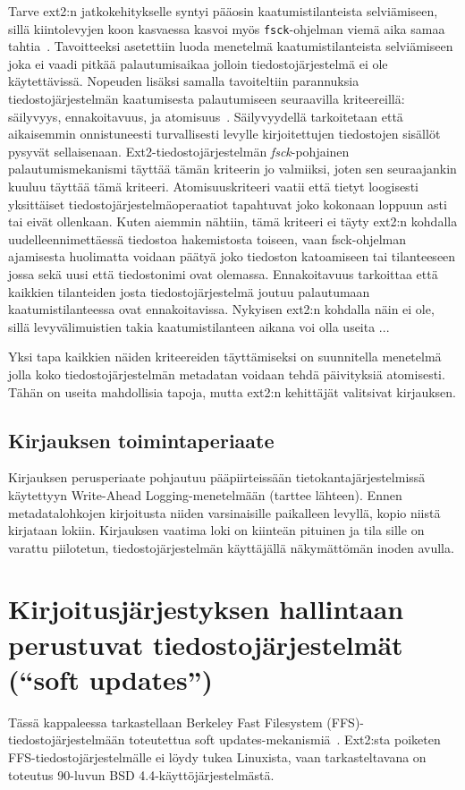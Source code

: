 Tarve ext2:n jatkokehitykselle syntyi pääosin kaatumistilanteista selviämiseen,
sillä kiintolevyjen koon kasvaessa kasvoi myös \texttt{fsck}-ohjelman viemä aika samaa tahtia~\cite{Ext2Journal}.
Tavoitteeksi asetettiin luoda menetelmä kaatumistilanteista selviämiseen joka ei vaadi pitkää palautumisaikaa jolloin tiedostojärjestelmä ei ole käytettävissä.
Nopeuden lisäksi samalla tavoiteltiin parannuksia tiedostojärjestelmän kaatumisesta palautumiseen seuraavilla kriteereillä: säilyvyys, ennakoitavuus, ja atomisuus~\cite{Ext2Journal}.
Säilyvyydellä tarkoitetaan että aikaisemmin onnistuneesti turvallisesti levylle kirjoitettujen tiedostojen sisällöt pysyvät sellaisenaan.
Ext2-tiedostojärjestelmän \emph{fsck}-pohjainen palautumismekanismi täyttää tämän kriteerin jo valmiiksi,
joten sen seuraajankin kuuluu täyttää tämä kriteeri.
Atomisuuskriteeri vaatii että tietyt loogisesti yksittäiset tiedostojärjestelmäoperaatiot tapahtuvat
joko kokonaan loppuun asti tai eivät ollenkaan.
Kuten aiemmin nähtiin, tämä kriteeri ei täyty ext2:n kohdalla uudelleennimettäessä tiedostoa hakemistosta toiseen,
vaan fsck-ohjelman ajamisesta huolimatta voidaan päätyä joko tiedoston katoamiseen tai tilanteeseen jossa sekä uusi että tiedostonimi ovat olemassa.
Ennakoitavuus tarkoittaa että kaikkien tilanteiden josta tiedostojärjestelmä joutuu palautumaan kaatumistilanteessa ovat ennakoitavissa.
Nykyisen ext2:n kohdalla näin ei ole, sillä levyvälimuistien takia kaatumistilanteen aikana voi olla useita ...

Yksi tapa kaikkien näiden kriteereiden täyttämiseksi on suunnitella menetelmä jolla koko tiedostojärjestelmän metadatan voidaan tehdä päivityksiä atomisesti.
Tähän on useita mahdollisia tapoja, mutta ext2:n kehittäjät valitsivat kirjauksen.

\subsection{Kirjauksen toimintaperiaate}

Kirjauksen perusperiaate pohjautuu pääpiirteissään tietokantajärjestelmissä käytettyyn Write-Ahead Logging-menetelmään (tarttee lähteen).
Ennen metadatalohkojen kirjoitusta niiden varsinaisille paikalleen levyllä, kopio niistä kirjataan lokiin.
Kirjauksen vaatima loki on kiinteän pituinen ja tila sille on varattu piilotetun, tiedostojärjestelmän käyttäjällä näkymättömän inoden avulla.

\section{Kirjoitusjärjestyksen hallintaan perustuvat tiedostojärjestelmät (``soft updates'')}
Tässä kappaleessa tarkastellaan Berkeley Fast Filesystem (FFS)-tiedostojärjestelmään toteutettua soft updates-mekanismiä~\cite{SoftUpdatesFfs}.
Ext2:sta poiketen FFS-tiedostojärjestelmälle ei löydy tukea Linuxista,
vaan tarkasteltavana on toteutus 90-luvun BSD 4.4-käyttöjärjestelmästä.

